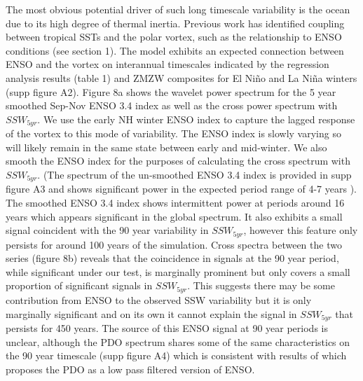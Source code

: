 \documentclass[wcd, manuscript]{copernicus}
\begin{document}
The most obvious potential driver of such long timescale variability is the ocean due to its high degree of thermal inertia. Previous work has identified coupling between tropical SSTs and the polar vortex, such as the relationship to ENSO conditions (see section 1). The model exhibits an expected connection between ENSO and the vortex on interannual timescales indicated by the regression analysis results (table 1) and ZMZW composites for El Ni\~{n}o and La Ni\~{n}a winters (supp figure A2). Figure 8a shows the wavelet power spectrum for the 5 year smoothed Sep-Nov ENSO 3.4 index as well as the cross power spectrum with $SSW_{5yr}$. We use the early NH winter ENSO index to capture the lagged response of the vortex to this mode of variability. The ENSO index is slowly varying so will likely remain in the same state between early and mid-winter. We also smooth the ENSO index for the purposes of calculating the cross spectrum with $SSW_{5yr}$. (The spectrum of the un-smoothed ENSO 3.4 index is provided in supp figure A3 and shows significant power in the expected period range of 4-7 years \citep{Santoso2017}). The smoothed ENSO 3.4 index shows intermittent power at periods around 16 years which appears significant in the global spectrum. It also exhibits a small signal coincident with the 90 year variability in $SSW_{5yr}$, however this feature only persists for around 100 years of the simulation. Cross spectra between the two series (figure 8b) reveals that the coincidence in signals at the 90 year period, while significant under our test, is marginally prominent but only covers a small proportion of significant signals in $SSW_{5yr}$. This suggests there may be some contribution from ENSO to the observed SSW variability but it is only marginally significant and on its own it cannot explain the signal in $SSW_{5yr}$ that persists for 450 years. The source of this ENSO signal at 90 year periods is unclear, although the PDO spectrum shares some of the same characteristics on the 90 year timescale (supp figure A4) which is consistent with results of \cite{Newman2016} which proposes the PDO as a low pass filtered version of ENSO. 
\end{document}

